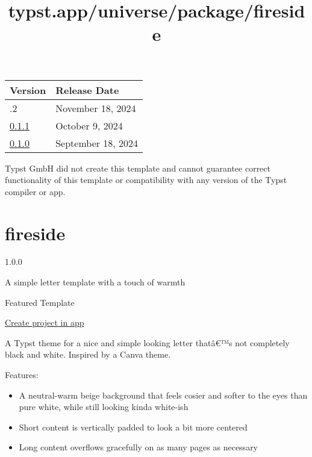 \begin{longtable}[]{@{}ll@{}}
\toprule\noalign{}
Version & Release Date \\
\midrule\noalign{}
\endhead
\bottomrule\noalign{}
\endlastfoot
0.1.2 & November 18, 2024 \\
\href{https://typst.app/universe/package/touying-brandred-uobristol/0.1.1/}{0.1.1}
& October 9, 2024 \\
\href{https://typst.app/universe/package/touying-brandred-uobristol/0.1.0/}{0.1.0}
& September 18, 2024 \\
\end{longtable}

Typst GmbH did not create this template and cannot guarantee correct
functionality of this template or compatibility with any version of the
Typst compiler or app.


\title{typst.app/universe/package/fireside}

\label{banner}
\label{template-thumbnail}

\section{fireside}\label{fireside}

{ 1.0.0 }

A simple letter template with a touch of warmth

{ } Featured Template

\href{/app?template=fireside&version=1.0.0}{Create project in app}

\label{readme}
A Typst theme for a nice and simple looking letter thatâ€™s not
completely black and white. Inspired by a Canva theme.

Features:

\begin{itemize}
\tightlist
\item
  A neutral-warm beige background that feels cosier and softer to the
  eyes than pure white, while still looking kinda white-ish
\item
  Short content is vertically padded to look a bit more centered
\item
  Long content overflows gracefully on as many pages as necessary
\end{itemize}

